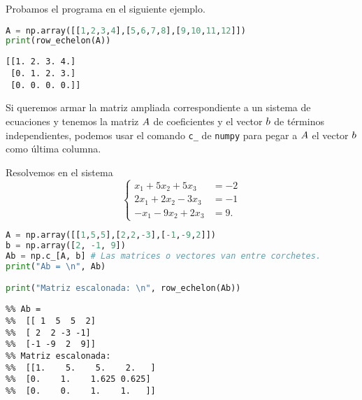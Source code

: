 Probamos el programa en el siguiente ejemplo.

\begin{Shaded}
\begin{lstlisting}[language=Python]
A = np.array([[1,2,3,4],[5,6,7,8],[9,10,11,12]])
print(row_echelon(A))
\end{lstlisting}
\end{Shaded}

\begin{verbatim}
[[1. 2. 3. 4.]
 [0. 1. 2. 3.]
 [0. 0. 0. 0.]]
\end{verbatim}

Si queremos armar la matriz ampliada correspondiente a un sistema de ecuaciones y tenemos la matriz $\Ab$ de coeficientes y el vector $\bb$ de términos independientes, podemos usar el comando \texttt{c\_} de \texttt{numpy} para pegar a $\Ab$ el vector $\bb$ como última columna.

\begin{ejemplo}
Resolvemos en \python el sistema
$$
\left\{
\begin{aligned}
x_1 + 5x_2 + 5x_3 &= -2 \\
2x_1 + 2x_2 - 3 x_3 &= -1 \\
-x_1 - 9 x_2 + 2 x_3 &= 9.
\end{aligned}
\right.
$$


\begin{Shaded}
\begin{lstlisting}[language=Python]
A = np.array([[1,5,5],[2,2,-3],[-1,-9,2]])
b = np.array([2, -1, 9])
Ab = np.c_[A, b] # Las matrices o vectores van entre corchetes.
print("Ab = \n", Ab)

print("Matriz escalonada: \n", row_echelon(Ab))
\end{lstlisting}
\end{Shaded}

\begin{verbatim}
%% Ab =
%%  [[ 1  5  5  2]
%%  [ 2  2 -3 -1]
%%  [-1 -9  2  9]]
%% Matriz escalonada:
%%  [[1.    5.    5.    2.   ]
%%  [0.    1.    1.625 0.625]
%%  [0.    0.    1.    1.   ]]
\end{verbatim}
\end{ejemplo}

